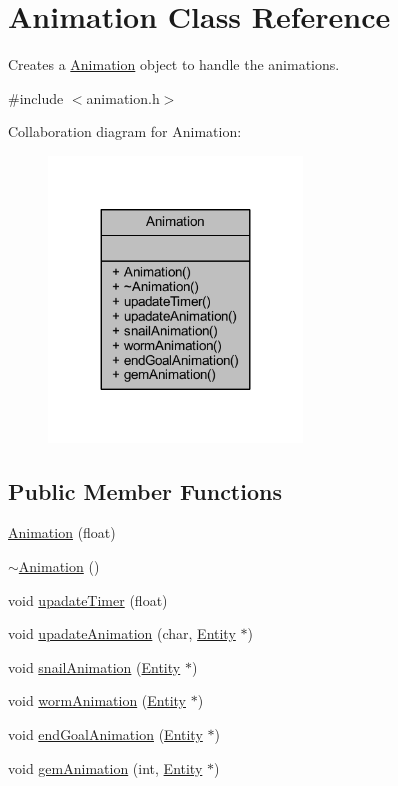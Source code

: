 \hypertarget{class_animation}{\section{Animation Class Reference}
\label{class_animation}
}


Creates a \hyperlink{class_animation}{Animation} object to handle the animations.  




{\ttfamily \#include $<$animation.\+h$>$}



Collaboration diagram for Animation\+:
\nopagebreak
\begin{figure}[H]
\begin{center}
\leavevmode
\includegraphics[width=191pt]{class_animation__coll__graph}
\end{center}
\end{figure}
\subsection*{Public Member Functions}
\begin{DoxyCompactItemize}
\item 
\hyperlink{class_animation_a3937169e447959e16931cf95ea0bea42}{Animation} (float)
\item 
\hyperlink{class_animation_a401b68793d4fbf48d481c030ee4b2a16}{$\sim$\+Animation} ()
\item 
void \hyperlink{class_animation_aa1b39bd3c7b83eea908d6e15896206ca}{upadate\+Timer} (float)
\item 
void \hyperlink{class_animation_a46ac949b21a0aed488953ee0a47ec35f}{upadate\+Animation} (char, \hyperlink{class_entity}{Entity} $\ast$)
\item 
void \hyperlink{class_animation_a64378ac8df319e785e93e8e2ff9b4f7d}{snail\+Animation} (\hyperlink{class_entity}{Entity} $\ast$)
\item 
void \hyperlink{class_animation_a28698eae748a6bcac0bbbafb1c62f32b}{worm\+Animation} (\hyperlink{class_entity}{Entity} $\ast$)
\item 
void \hyperlink{class_animation_aa991142b70b9d07bde2a2b4a934fae16}{end\+Goal\+Animation} (\hyperlink{class_entity}{Entity} $\ast$)
\item 
void \hyperlink{class_animation_a988b1ced0cf9d9a64ed3fb0891e3c563}{gem\+Animation} (int, \hyperlink{class_entity}{Entity} $\ast$)
\end{DoxyCompactItemize}


